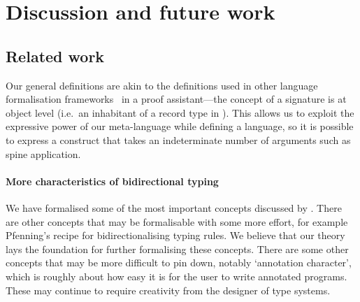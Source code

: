 
\section{Discussion and future work} \label{sec:future}

\subsection{Related work}
\citet{Harper1993a,Harper2007}

Our general definitions are akin to the definitions used in other language formalisation frameworks~\citep{Ahrens2022,Allais2021,Fiore2022} in a proof assistant---the concept of a signature is at object level (i.e.\ an inhabitant of a record type in \Agda).
This allows us to exploit the expressive power of our meta-language while defining a language, so it is possible to express a construct that takes an indeterminate number of arguments such as spine application.

%
\paragraph{More characteristics of bidirectional typing}

We have formalised some of the most important concepts discussed by \citet{Dunfield2021}.
There are other concepts that may be formalisable with some more effort, for example Pfenning's recipe for bidirectionalising typing rules.
We believe that our theory lays the foundation for further formalising these concepts.
There are some other concepts that may be more difficult to pin down, notably `annotation character', which is roughly about how easy it is for the user to write annotated programs.
These may continue to require creativity from the designer of type systems.

